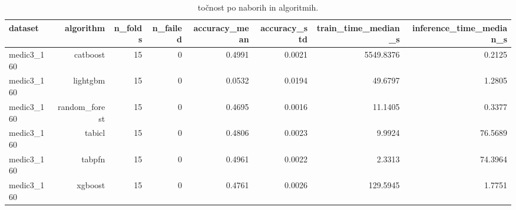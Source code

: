 \begin{table}[htbp]
\centering
\caption{točnost po naborih in algoritmih.}
\label{tab:per-dataset}
\begin{tabular}{lrrrrrrr}
\hline
dataset & algorithm & n\_folds & n\_failed & accuracy\_mean & accuracy\_std & train\_time\_median\_s & inference\_time\_median\_s \\
\hline
medic3\_160 & catboost & 15 & 0 & 0.4991 & 0.0021 & 5549.8376 & 0.2125 \\
medic3\_160 & lightgbm & 15 & 0 & 0.0532 & 0.0194 & 49.6797 & 1.2805 \\
medic3\_160 & random\_forest & 15 & 0 & 0.4695 & 0.0016 & 11.1405 & 0.3377 \\
medic3\_160 & tabicl & 15 & 0 & 0.4806 & 0.0023 & 9.9924 & 76.5689 \\
medic3\_160 & tabpfn & 15 & 0 & 0.4961 & 0.0022 & 2.3313 & 74.3964 \\
medic3\_160 & xgboost & 15 & 0 & 0.4761 & 0.0026 & 129.5945 & 1.7751 \\
\hline
\end{tabular}
\end{table}
